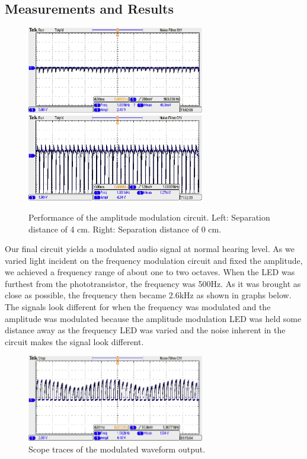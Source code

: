 \documentclass[twocolumn]{article}
\begin{document}
\subsection{Measurements and Results}
\begin{figure}
 \centering
\includegraphics[width=220pt]{figure/a1}
\includegraphics[width=220pt]{figure/a2}
\caption{Performance of the amplitude modulation circuit. Left: Separation distance of 4 cm. Right: Separation distance of 0 cm.}
\label{a}
\end{figure}
Our final circuit yields a modulated audio signal at normal hearing level.  As we varied light incident on the frequency modulation circuit and fixed the amplitude, we achieved a frequency range of about one to two octaves. When the LED was furthest from the phototransistor, the frequency was 500Hz. As it was brought as close as possible, the frequency then became 2.6kHz as shown in graphs below. The signals look different for when the frequency was modulated and the amplitude was modulated because the amplitude modulation LED was held some distance away as the frequency LED was varied and the noise inherent in the circuit makes the signal look different.
\begin{figure}[h!]
 \centering
 \includegraphics[width=220pt]{figure/octave}
\caption{Scope traces of the modulated waveform output.}
\label{octave}
\end{figure}
\end{document}
